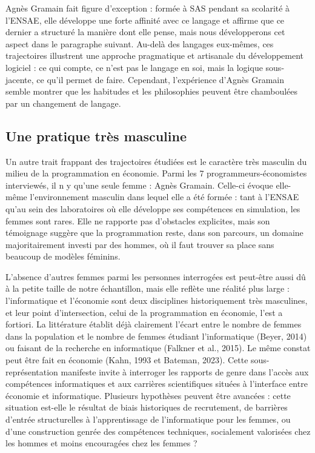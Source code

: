 Agnès Gramain fait figure d’exception : formée à SAS pendant sa scolarité à l’ENSAE, elle développe une forte affinité avec ce langage et affirme que ce dernier a structuré la manière dont elle pense, mais nous développerons cet aspect dans le paragraphe suivant. Au-delà des langages eux-mêmes, ces trajectoires illustrent une approche pragmatique et artisanale du développement logiciel : ce qui compte, ce n’est pas le langage en soi, mais la logique sous-jacente, ce qu’il permet de faire. Cependant, l’expérience d’Agnès Gramain semble montrer que les habitudes et les philosophies peuvent être chamboulées par un changement de langage.

\subsection{Une pratique très masculine}

Un autre trait frappant des trajectoires étudiées est le caractère très masculin du milieu de la programmation en économie. Parmi les 7 programmeurs-économistes interviewés, il n y qu'une seule femme : Agnès Gramain. Celle-ci évoque elle-même l’environnement masculin dans lequel elle a été formée : tant à l’ENSAE qu’au sein des laboratoires où elle développe ses compétences en simulation, les femmes sont rares. Elle ne rapporte pas d’obstacles explicites, mais son témoignage suggère que la programmation reste, dans son parcours, un domaine majoritairement investi par des hommes, où il faut trouver sa place sans beaucoup de modèles féminins. 

L’absence d’autres femmes parmi les personnes interrogées est peut-être aussi dû à la petite taille de notre échantillon, mais elle reflète une réalité plus large : l’informatique et l’économie sont deux disciplines historiquement très masculines, et leur point d’intersection, celui de la programmation en économie, l’est a fortiori. La littérature établit déjà clairement l'écart entre le nombre de femmes dans la population et le nombre de femmes étudiant l'informatique (Beyer, 2014\cite{beyerWhyAreWomen2014}) ou faisant de la recherche en informatique (Falkner et al., 2015\cite{falknerGenderGapAcademia2015}). Le même constat peut être fait en économie (Kahn, 1993\cite{kahnGenderDifferencesAcademic1993} et Bateman, 2023\cite{batemanGenderGapUK2023}). Cette sous-représentation manifeste invite à interroger les rapports de genre dans l’accès aux compétences informatiques et aux carrières scientifiques situées à l’interface entre économie et informatique. Plusieurs hypothèses peuvent être avancées : cette situation est-elle le résultat de biais historiques de recrutement, de barrières d’entrée structurelles à l’apprentissage de l’informatique pour les femmes, ou d’une construction genrée des compétences techniques, socialement valorisées chez les hommes et moins encouragées chez les femmes ? 

